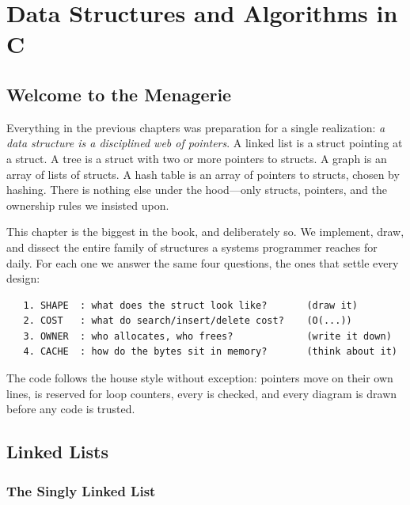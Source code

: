 
\chapter{Data Structures and Algorithms in C}

\section{Welcome to the Menagerie}

Everything in the previous chapters was preparation for a single
realization: \emph{a data structure is a disciplined web of pointers}. A
linked list is a struct pointing at a struct. A tree is a struct with
two or more pointers to structs. A graph is an array of lists of
structs. A hash table is an array of pointers to structs, chosen by
hashing. There is nothing else under the hood---only structs, pointers,
and the ownership rules we insisted upon.

This chapter is the biggest in the book, and deliberately so. We
implement, draw, and dissect the entire family of structures a systems
programmer reaches for daily. For each one we answer the same four
questions, the ones that settle every design:

\begin{verbatim}
   1. SHAPE  : what does the struct look like?       (draw it)
   2. COST   : what do search/insert/delete cost?    (O(...))
   3. OWNER  : who allocates, who frees?             (write it down)
   4. CACHE  : how do the bytes sit in memory?       (think about it)
\end{verbatim}

The code follows the house style without exception: pointers move on
their own lines,  is reserved for loop counters, every
 is checked, and every diagram is drawn before any code is
trusted.

\section{Linked Lists}

\subsection{The Singly Linked List}


